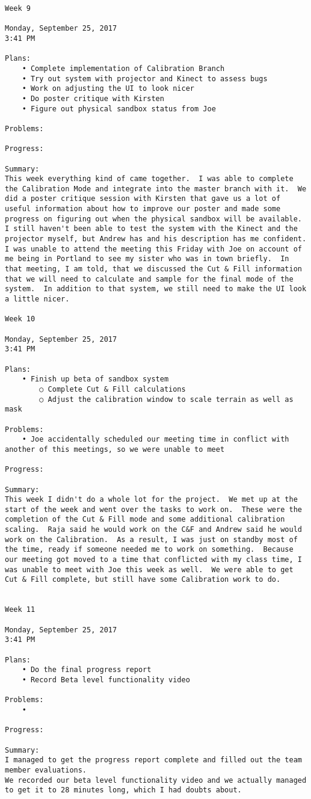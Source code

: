 \begin{lstlisting}
Week 9

Monday, September 25, 2017
3:41 PM

Plans:
	• Complete implementation of Calibration Branch
	• Try out system with projector and Kinect to assess bugs
	• Work on adjusting the UI to look nicer
	• Do poster critique with Kirsten
	• Figure out physical sandbox status from Joe

Problems:

Progress:

Summary:
This week everything kind of came together.  I was able to complete the Calibration Mode and integrate into the master branch with it.  We did a poster critique session with Kirsten that gave us a lot of useful information about how to improve our poster and made some progress on figuring out when the physical sandbox will be available.  I still haven't been able to test the system with the Kinect and the projector myself, but Andrew has and his description has me confident.  I was unable to attend the meeting this Friday with Joe on account of me being in Portland to see my sister who was in town briefly.  In that meeting, I am told, that we discussed the Cut & Fill information that we will need to calculate and sample for the final mode of the system.  In addition to that system, we still need to make the UI look a little nicer.

Week 10

Monday, September 25, 2017
3:41 PM

Plans:
	• Finish up beta of sandbox system
		○ Complete Cut & Fill calculations
		○ Adjust the calibration window to scale terrain as well as mask

Problems:
	• Joe accidentally scheduled our meeting time in conflict with another of this meetings, so we were unable to meet

Progress:

Summary:
This week I didn't do a whole lot for the project.  We met up at the start of the week and went over the tasks to work on.  These were the completion of the Cut & Fill mode and some additional calibration scaling.  Raja said he would work on the C&F and Andrew said he would work on the Calibration.  As a result, I was just on standby most of the time, ready if someone needed me to work on something.  Because our meeting got moved to a time that conflicted with my class time, I was unable to meet with Joe this week as well.  We were able to get Cut & Fill complete, but still have some Calibration work to do.


Week 11

Monday, September 25, 2017
3:41 PM

Plans:
	• Do the final progress report
	• Record Beta level functionality video

Problems:
	• 

Progress:

Summary:
I managed to get the progress report complete and filled out the team member evaluations.
We recorded our beta level functionality video and we actually managed to get it to 28 minutes long, which I had doubts about.


\end{lstlisting}


